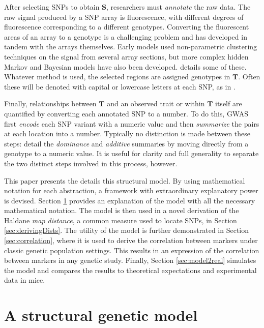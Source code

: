 \documentclass{article}
\newcommand{\m}[1]{\mathbf{#1}}               %
\begin{document}
After selecting SNPs to obtain $\m{S}$, researchers must \emph{annotate} the raw data. The raw signal produced by a SNP array is fluorescence, with different degrees of fluorescence corresponding to a different genotypes. Converting the fluorescent areas of an array to a genotype is a challenging problem and has developed in tandem with the arrays themselves. Early models used non-parametric clustering techniques on the signal from several array sections, but more complex hidden Markov and Bayesian models have also been developed. \cite{laframboise2009} details some of these. Whatever method is used, the selected regions are assigned genotypes in $\m{T}$. Often these will be denoted with capital or lowercase letters at each SNP, as in \cite{siegmundyakir2007, visschergoddard2019}.

Finally, relationships between $\m{T}$ and an observed trait or within $\m{T}$ itself are quantified by converting each annotated SNP to a number. To do this, GWAS first \emph{encode} each SNP variant with a numeric value and then \emph{summarize} the pairs at each location into a number. Typically no distinction is made between these steps: \cite{LanderBotstein1989, cheverud2001, siegmundyakir2007} detail the \emph{dominance} and \emph{additive} summaries by moving directly from a genotype to a numeric value. It is useful for clarity and full generality to separate the two distinct steps involved in this process, however.

This paper presents the details this structural model. By using mathematical notation for each abstraction, a framework with extraordinary explanatory power is devised. Section \ref{sec:theModel} provides an explanation of the model with all the necessary mathematical notation. The model is then used in a novel derivation of the Haldane \emph{map distance}, a common measure used to locate SNPs, in Section \ref{sec:derivingDists}. The utility of the model is further demonstrated in Section \ref{sec:correlation}, where it is used to derive the correlation between markers under classic genetic population settings. This results in an expression of the correlation between markers in any genetic study. Finally, Section \ref{sec:model2real} simulates the model and compares the results to theoretical expectations and experimental data in mice.

\section{A structural genetic model} \label{sec:theModel}
\end{document}
